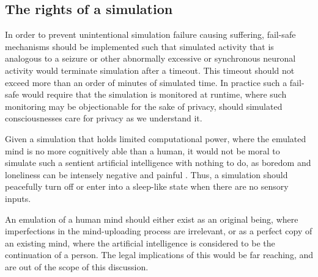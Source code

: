 \subsection{The rights of a simulation}

In order to prevent unintentional simulation failure causing suffering, fail-safe
mechanisms should be implemented such that simulated activity that is analogous
to a seizure or other abnormally excessive or synchronous neuronal activity
would terminate simulation after a timeout. This timeout should not exceed more
than an order of minutes of simulated time. In practice such a fail-safe
would require that the simulation is monitored at runtime, where such monitoring
may be objectionable for the sake of privacy, should simulated consciousnesses
care for privacy as we understand it.

Given a simulation that holds limited computational power, where the emulated
mind is no more cognitively able than a human, it would not be moral to simulate
such a sentient artificial intelligence with nothing to do, as boredom and
loneliness can be intensely negative and painful
\autocite{hawkley_loneliness_2010}. Thus, a simulation should peacefully turn
off or enter into a sleep-like state when there are no sensory inputs.

An emulation of a human mind should either exist as an original being, where
imperfections in the mind-uploading process are irrelevant, or as a perfect copy
of an existing mind, where the artificial intelligence is considered to be the
continuation of a person. The legal implications of this would be far reaching,
and are out of the scope of this discussion.



